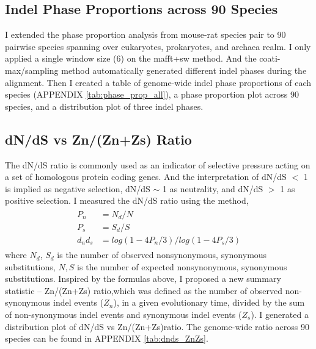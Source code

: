 \subsection{Indel Phase Proportions across 90 Species}
I extended the phase proportion analysis from mouse-rat species pair to 90 pairwise species spanning over eukaryotes, prokaryotes, and archaea realm. I only applied a single window size (6) on the mafft+sw method. And the coati-max/sampling method automatically generated different indel phases during the alignment. Then I created a table of genome-wide indel phase proportions of each species (APPENDIX \ref{tab:phase_prop_all}), a phase proportion plot across 90 species, and a distribution plot of three indel phases.   

\subsection{dN/dS vs Zn/(Zn+Zs) Ratio}
The dN/dS ratio is commonly used as an indicator of selective pressure acting on a set of homologous protein coding genes. And the interpretation of dN/dS $<$ 1 is implied as negative selection, dN/dS $\sim$ 1 as neutrality, and dN/dS $>$ 1 as positive selection. I measured the dN/dS ratio using the \parencite{nei1986simple} method, 
\begin{gather*} 
\begin{aligned}
 P_n  &= N_d/ N \\
 P_s   &= S_d/S \\
 d_{n}d_{s} &= log(1-4P_n/3)/log(1-4P_s/3) 
\end{aligned}
\end{gather*}
where $N_d$, $S_d$ is the number of observed nonsynonymous, synonymous substitutions, $N,S$ is the number of expected nonsynonymous, synonymous substitutions. Inspired by the formulas above, I proposed a new summary statistic -- Zn/(Zn+Zs) ratio,which was defined as the number of observed non-synonymous indel events ($Z_n$), in a given evolutionary time, divided by the sum of non-synonymous indel events and synonymous indel events ($Z_s$). I generated a distribution plot of dN/dS vs Zn/(Zn+Zs)ratio. The genome-wide ratio across 90 species can be found in APPENDIX \ref{tab:dnds_ZnZs}. 

